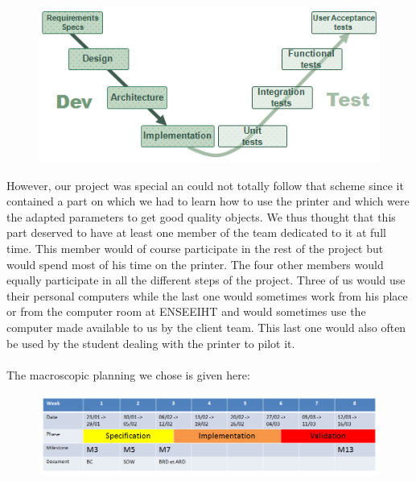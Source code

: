 \documentclass{report}
\begin{document}
\begin{figure}[!h]
\begin{center}
	\includegraphics[scale=4.5]{VCycle}
\end{center}
\end{figure}

However, our project was special an could not totally follow that scheme since it contained a part on which we had to learn how to use the printer and which were the adapted parameters to get good quality objects. We thus thought that this part deserved to have at least one member of the team dedicated to it at full time. This member would of course participate in the rest of the project but would spend most of his time on the printer. The four other members would equally participate in all the different steps of the project. Three of us would use their personal computers while the last one would sometimes work from his place or from the computer room at ENSEEIHT and would sometimes use the computer made available to us by the client team. This last one would also often be used by the student dealing with the printer to pilot it.\\\\

The macroscopic planning we chose is given here:

\bigskip
\begin{figure}[!h]
\begin{center}
	\includegraphics[scale=0.4]{PlanningMacroscopique}
\end{center}
\end{figure}
\end{document}
